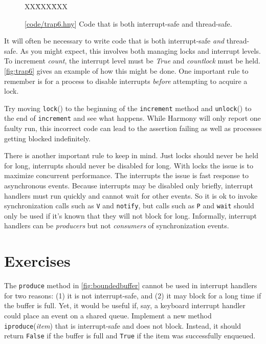 \documentclass{report}
\newcommand{\harmonysource}[1]{
\begin{tabbing}
XX\=XXX\=XXX\kill
    
\end{tabbing}
}
\newcommand{\harmonylink}[1]{%
[\href{https://www.cs.cornell.edu/home/rvr/harmony/#1}{\underline{#1}}]%
}
\newenvironment{code}{
\tcolorbox
}{
\endtcolorbox
}
\begin{document}
\begin{figure}
\begin{code}
\harmonysource{trap6}
\end{code}
\caption{\harmonylink{code/trap6.hny} Code that is both interrupt-safe and thread-safe.}
\label{fig:trap6}
\end{figure}

It will often be necessary to write code that is both interrupt-safe \emph{and}
thread-safe.  As you might expect, this involves both managing locks and
interrupt levels.
To increment \textit{count}, the interrupt level must be \textit{True} and
\textit{countlock} must be held.
\autoref{fig:trap6} gives an example of how this might be done.
One important rule to remember is for a process to disable interrupts \emph{before}
attempting to acquire a lock.

Try moving \texttt{lock}() to the beginning of the \texttt{increment} method
and \texttt{unlock}() to the end of \texttt{increment} and see what happens.
While Harmony will only report one faulty run, this incorrect code can lead to
the assertion failing as well as processes getting blocked indefinitely.

There is another important rule to keep in mind.  Just locks should never be held
for long, interrupts should never be disabled for long.  With locks the issue is to
maximize concurrent performance.  The interrupts the issue is fast response to
asynchronous events.  Because interrupts may be disabled only briefly, interrupt
handlers must run quickly and cannot wait for other events.  So it is ok to invoke
synchronization calls such as \texttt{V} and \texttt{notify}, but calls such as
\texttt{P} and \texttt{wait} should only be used if it's known that they will not
block for long.  Informally, interrupt handlers can be
\emph{producers} but not \emph{consumers} of synchronization events.

\section*{Exercises}
\begin{problems}
\item The \texttt{produce} method in \autoref{fig:boundedbuffer} cannot be used
in interrupt handlers for two reasons: (1) it is not interrupt-safe, and (2)
it may block for a long time if the buffer is full.  Yet, it would be useful if,
say, a keyboard interrupt handler could place an event on a shared queue.  Implement
a new method \texttt{iproduce}(\textit{item}) that is interrupt-safe and does not
block.  Instead, it should return \texttt{False} if the buffer is full and \texttt{True}
if the item was successfully enqueued.
\end{problems}
\end{document}
